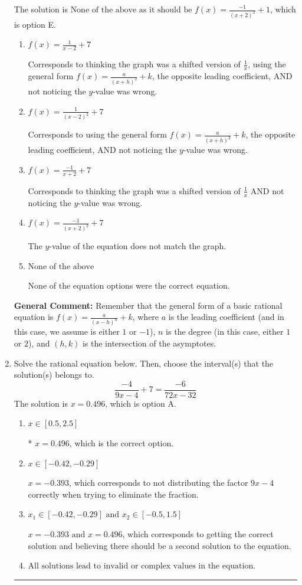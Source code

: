 \documentclass{extbook}[14pt]
\newcommand{\litem}[1]{\item #1

\rule{\textwidth}{0.4pt}}
\begin{document}
\begin{enumerate}
{The solution is \( \text{None of the above as it should be } f(x) = \frac{-1}{(x + 2)^2} + 1 \), which is option E.\begin{enumerate}[label=\Alph*.]
\item \( f(x) = \frac{1}{x - 2} + 7 \)

Corresponds to thinking the graph was a shifted version of $\frac{1}{x}$, using the general form $f(x) = \frac{a}{(x+h)^2}+k$, the opposite leading coefficient, AND not noticing the $y$-value was wrong.
\item \( f(x) = \frac{1}{(x - 2)^2} + 7 \)

Corresponds to using the general form $f(x) = \frac{a}{(x+h)^2}+k$, the opposite leading coefficient, AND not noticing the $y$-value was wrong.
\item \( f(x) = \frac{-1}{x + 2} + 7 \)

Corresponds to thinking the graph was a shifted version of $\frac{1}{x}$ AND not noticing the $y$-value was wrong.
\item \( f(x) = \frac{-1}{(x + 2)^2} + 7 \)

The $y$-value of the equation does not match the graph.
\item \( \text{None of the above} \)

None of the equation options were the correct equation.
\end{enumerate}

\textbf{General Comment:} Remember that the general form of a basic rational equation is $ f(x) = \frac{a}{(x-h)^n} + k$, where $a$ is the leading coefficient (and in this case, we assume is either $1$ or $-1$), $n$ is the degree (in this case, either $1$ or $2$), and $(h, k)$ is the intersection of the asymptotes.
}
\litem{
Solve the rational equation below. Then, choose the interval(s) that the solution(s) belongs to.
\[ \frac{-4}{9x -4} + 7 = \frac{-6}{72x -32} \]The solution is \( x = 0.496 \), which is option A.\begin{enumerate}[label=\Alph*.]
\item \( x \in [0.5,2.5] \)

* $x = 0.496$, which is the correct option.
\item \( x \in [-0.42,-0.29] \)

$x = -0.393$, which corresponds to not distributing the factor $9x -4$ correctly when trying to eliminate the fraction.
\item \( x_1 \in [-0.42, -0.29] \text{ and } x_2 \in [-0.5,1.5] \)

$x = -0.393 \text{ and } x = 0.496$, which corresponds to getting the correct solution and believing there should be a second solution to the equation.
\item \( \text{All solutions lead to invalid or complex values in the equation.} \)


\end{enumerate}}
\end{enumerate}
\end{document}
